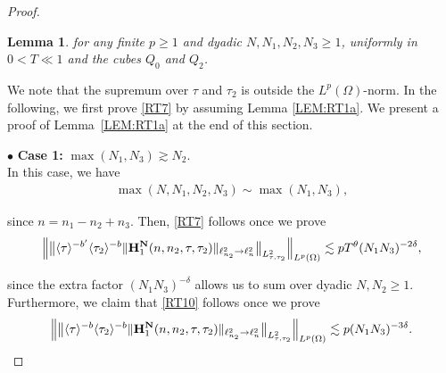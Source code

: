 \documentclass[%
11pt,  reqno]{amsart}
\newtheorem{lemma}[theorem]{Lemma}
\newcommand{\1}{\hspace{0.2mm}\text{I}\hspace{0.2mm}}
\newcommand{\noi}{\noindent}
\newcommand{\dl}{\delta}
\newcommand{\ta}{\theta}
\renewcommand{\l}{\ell}
\renewcommand{\O}{\Omega}
\newcommand{\les}{\lesssim}
\newcommand{\ges}{\gtrsim}
\newcommand{\jb}[1]
{\langle #1 \rangle}
\numberwithin{equation}{section}
\numberwithin{theorem}{section}
\newcommand{\Hb}{\mathbf{H}}
\begin{document}
\begin{proof}
\begin{lemma}
\noi 
for any finite $p \ge 1$
and  dyadic $N, N_1,  N_2, N_3  \ge 1$, 
uniformly in $0 < T \ll 1$
and the cubes $Q_0$ and $Q_2$.


\end{lemma}


We note that the supremum over $\tau$ and $\tau_2$ 
is outside the $L^p(\O)$-norm.
In the following, we first prove \eqref{RT7}
by assuming  Lemma \ref{LEM:RT1a}.
We present a proof of  Lemma~\ref{LEM:RT1a} 
at the end of this section.




\medskip

\noi 
$\bullet$ {\bf Case 1:}
 $\max (N_1, N_3) \ges N_2$. 
\\
\indent
In this case, we have
\begin{align}
\max (N, N_1, N_2, N_3)\sim \max (N_1, N_3),
\label{RT9a}
\end{align}

\noi
since $n = n_1 - n_2 + n_3$.
Then, 
 \eqref{RT7}
 follows once we prove 
\begin{align}
\label{RT10}
\Big\| \big\| \jb{\tau}^{-b'} \jb{\tau_2}^{-b} 
\| \Hb_1^{\bf N}
 (n,n_2,\tau, \tau_2) \|_{\l^2_{n_2} \to \l^2_n} \big\|_{L^2_{\tau, \tau_2}} \Big\|_{L^p (\O)} \les p T^\ta (N_1N_3)^{-2 \dl}, 
\end{align}

\noi 
since the extra factor $(N_1N_3)^{- \dl}$
allows us to sum over dyadic $N,  N_2 \ge 1$.
Furthermore, we  claim that 
 \eqref{RT10} follows once we prove 
\begin{align}
\label{RT11}
\Big\| \big\| \jb{\tau}^{-b} \jb{\tau_2}^{-b} 
\| \Hb_1^{\bf N} (n,n_2,\tau, \tau_2) \|_{\l^2_{n_2} \to \l^2_n} \big\|_{L^2_{\tau, \tau_2}} \Big\|_{L^p (\O)} \les p (N_1N_3)^{-3\dl}.
\end{align}


\end{proof}
\end{document}

